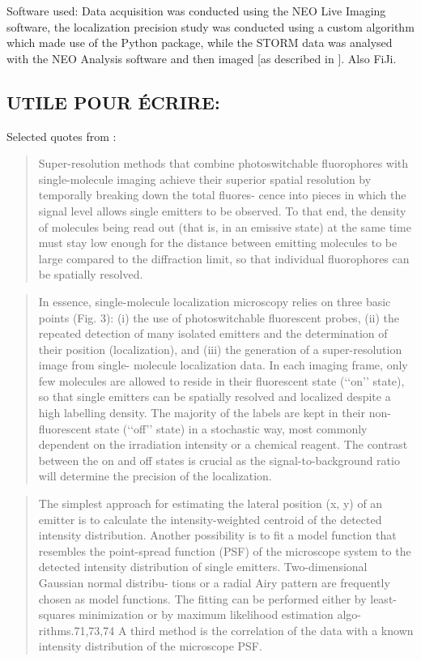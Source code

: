 Software used:
Data acquisition was conducted using the NEO Live Imaging software, the localization precision study was conducted using a custom algorithm which made use of the  Python package, while the STORM data was analysed with the NEO Analysis software and then imaged [as described in \cite{martens_raw_2022}].
Also FiJi.

\subsection{UTILE POUR ÉCRIRE:}
Selected quotes from \cite{furstenberg_single-molecule_2013}:
\begin{quote}
    Super-resolution methods that combine photoswitchable
    fluorophores with single-molecule imaging achieve their superior
    spatial resolution by temporally breaking down the total fluores-
    cence into pieces in which the signal level allows single emitters to
    be observed. To that end, the density of molecules being read out
    (that is, in an emissive state) at the same time must stay low
    enough for the distance between emitting molecules to be large
    compared to the diﬀraction limit, so that individual fluorophores
    can be spatially resolved. \cite{furstenberg_single-molecule_2013}
\end{quote}
\begin{quote}
    In essence, single-molecule localization microscopy relies on
    three basic points (Fig. 3): (i) the use of photoswitchable
    fluorescent probes, (ii) the repeated detection of many isolated
    emitters and the determination of their position (localization),
    and (iii) the generation of a super-resolution image from single-
    molecule localization data. In each imaging frame, only few
    molecules are allowed to reside in their fluorescent state
    (‘‘on’’ state), so that single emitters can be spatially resolved
    and localized despite a high labelling density. The majority of
    the labels are kept in their non-fluorescent state (‘‘oﬀ’’ state) in
    a stochastic way, most commonly dependent on the irradiation
    intensity or a chemical reagent. The contrast between the on
    and oﬀ states is crucial as the signal-to-background ratio will
    determine the precision of the localization. \cite{furstenberg_single-molecule_2013}
\end{quote}
\begin{quote}
    The simplest
    approach for estimating the lateral position (x, y) of an emitter
    is to calculate the intensity-weighted centroid of the detected
    intensity distribution. Another possibility is to fit a model
    function that resembles the point-spread function (PSF) of
    the microscope system to the detected intensity distribution
    of single emitters. Two-dimensional Gaussian normal distribu-
    tions or a radial Airy pattern are frequently chosen as model
    functions. The fitting can be performed either by least-squares
    minimization or by maximum likelihood estimation algo-
    rithms.71,73,74 A third method is the correlation of the data
    with a known intensity distribution of the microscope PSF. \cite{furstenberg_single-molecule_2013}
\end{quote}